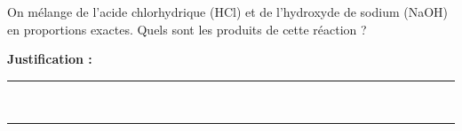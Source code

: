 On mélange de l'acide chlorhydrique (HCl) et de l'hydroxyde de sodium (NaOH) en proportions exactes. Quels sont les produits de cette réaction ?

\choices

\noindent\textbf{Justification :} \hrulefill \\[2.5ex]
\rule{\linewidth}{0.4pt} \\[2.5ex]
\rule{\linewidth}{0.4pt}
\vfill
